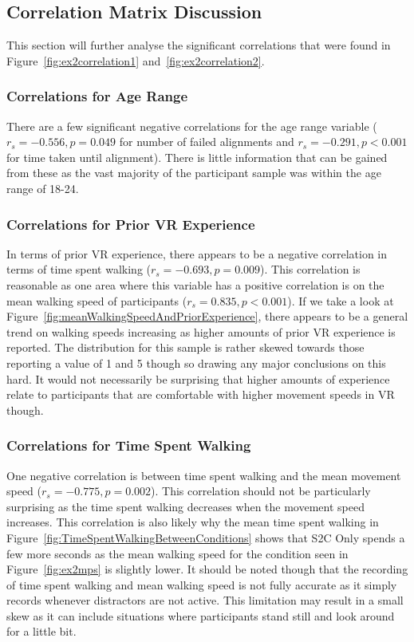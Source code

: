 \subsection{Correlation Matrix Discussion}\label{sec:ex2correlationAnalysis}
This section will further analyse the significant correlations that were found in Figure~\ref{fig:ex2correlation1} and~\ref{fig:ex2correlation2}. 

\subsubsection{Correlations for Age Range}
There are a few significant negative correlations for the age range variable ($r_s = -0.556, p = 0.049$ for number of failed alignments and $r_s = -0.291, p < 0.001$ for time taken until alignment). There is little information that can be gained from these as the vast majority of the participant sample was within the age range of 18-24. 

\subsubsection{Correlations for Prior VR Experience}
In terms of prior VR experience, there appears to be a negative correlation in terms of time spent walking ($r_s = -0.693, p = 0.009$). This correlation is reasonable as one area where this variable has a positive correlation is on the mean walking speed of participants ($r_s = 0.835, p < 0.001$). If we take a look at Figure~\ref{fig:meanWalkingSpeedAndPriorExperience}, there appears to be a general trend on walking speeds increasing as higher amounts of prior VR experience is reported. The distribution for this sample is rather skewed towards those reporting a value of 1 and 5 though so drawing any major conclusions on this hard. It would not necessarily be surprising that higher amounts of experience relate to participants that are comfortable with higher movement speeds in VR though.

\subsubsection{Correlations for Time Spent Walking}
One negative correlation is between time spent walking and the mean movement speed ($r_s = -0.775, p = 0.002$). This correlation should not be particularly surprising as the time spent walking decreases when the movement speed increases. This correlation is also likely why the mean time spent walking in Figure~\ref{fig:TimeSpentWalkingBetweenConditions} shows that S2C Only spends a few more seconds as the mean walking speed for the condition seen in Figure~\ref{fig:ex2mps} is slightly lower. It should be noted though that the recording of time spent walking and mean walking speed is not fully accurate as it simply records whenever distractors are not active. This limitation may result in a small skew as it can include situations where participants stand still and look around for a little bit. 

